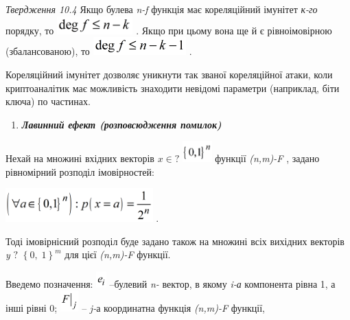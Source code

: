 \documentclass[a4paper]{article}
\newcounter{saveenum}
\newcommand\liststyleWWviiiNumxxix{%
\renewcommand\theenumi{\arabic{enumi}}
\renewcommand\theenumii{\arabic{enumii}}
\renewcommand\theenumiii{\roman{enumiii}}
\renewcommand\theenumiv{\arabic{enumiv}}
\renewcommand\labelenumi{\theenumi.}
\renewcommand\labelenumii{\theenumii.}
\renewcommand\labelenumiii{\theenumiii.}
\renewcommand\labelenumiv{\theenumiv.}
}
\newcounter{}
\begin{document}
\textit{Твердження 10.4}\textit{  }Якщо булева \textit{n}\textit{{}-}\textit{f} 
функція  має кореляційний імунітет \textit{к-го }порядку, то 
\includegraphics[width=1.1535in,height=0.272in]{crypt-img/crypt-img223.png} .
Якщо при цьому вона ще й  є рівноімовірною (збалансованою), то 
\includegraphics[width=1.4134in,height=0.272in]{crypt-img/crypt-img224.png} .

Кореляційний імунітет дозволяє уникнути так званої кореляційної атаки, коли
криптоаналітик має можливість знаходити невідомі параметри (наприклад, біти
ключа) по частинах.


\bigskip

\liststyleWWviiiNumxxix
\setcounter{saveenum}{\value{enumi}}
\begin{enumerate}
\setcounter{enumi}{\value{saveenum}}
\item {\bfseries\itshape
Лавинний ефект (розповсюдження помилок)}
\end{enumerate}
Нехай на множині  вхідних векторів  ${x\in ?}$
\includegraphics[width=0.4437in,height=0.3193in]{crypt-img/crypt-img225.png} 
функції \textit{(}\textit{n}\textit{,}\textit{m}\textit{)-}\textit{F} , задано
рівномірний розподіл імовірностей:

{\centering
 \includegraphics[width=2.2354in,height=0.5091in]{crypt-img/crypt-img226.png} .
\par}

Тоді імовірнісний розподіл буде задано також на множині всіх вихідних векторів
\textit{y} ${?}$ ${\left\{0,\;1\right\}^{{m}}}$ для цієї 
\textit{(}\textit{n}\textit{,}\textit{m}\textit{)-}\textit{F}  функції.

Введемо позначення: 
\includegraphics[width=0.1528in,height=0.25in]{crypt-img/crypt-img227.png} 
–булевий \textit{n}\textit{{}-} вектор, в якому \textit{i-а }компонента рівна
1, а інші рівні 0; 
\includegraphics[width=0.278in,height=0.3193in]{crypt-img/crypt-img228.png}  –
\textit{j-}а\textit{ }координатна функція
\textit{(}\textit{n}\textit{,}\textit{m}\textit{)-}\textit{F}  функції,
\end{document}
